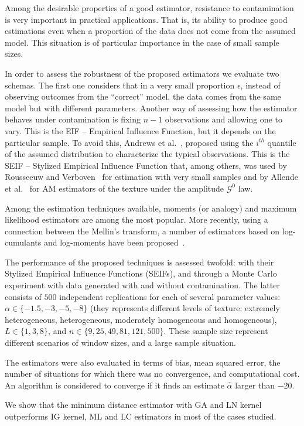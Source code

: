 \documentclass[a4paper]{article} %
\begin{document}
Among the desirable properties of a good estimator, resistance to contamination is very important in practical applications. 
That is, its ability to produce good estimations even when a proportion of the data does not come from the assumed model. 
This situation is of particular importance in the case of small sample sizes.

In order to assess the robustness of the proposed estimators we evaluate two schemas. 
The first one considers that in a very small proportion $\epsilon$, instead of observing outcomes from the ``correct'' model, the data comes from the same model but with different parameters.
Another way of assessing how the estimator behaves under contamination is fixing $n-1$ observations and allowing one to vary. 
This is the EIF -- Empirical Influence Function, but it depends on the particular sample.
To avoid this, Andrews et al.~\cite{Andrews1972}, proposed using the $i^{th}$ quantile of the assumed distribution to characterize the typical observations.
This is the SEIF -- Stylized Empirical Influence Function that, among others, was used by Rousseeuw and Verboven~\cite{RousseeuwCSDA} for estimation with very small samples and by Allende et al.~\cite{AllendeFreryetal:JSCS:05} for AM estimators of the texture under the amplitude $\mathcal G^0$ law.

Among the estimation techniques available, moments (or analogy) and maximum likelihood estimators are among the most popular.  
More recently, using a connection between the Mellin's transform, a number of estimators based on log-cumulants  and log-moments have been proposed~\cite{MellinAnalysisPolSAR,BujorTrouveValetNicolas2004,khan2014}.

The performance of the proposed techniques is assessed twofold: with their Stylized Empirical Influence Functions (SEIFs), and through a Monte Carlo experiment with data generated with and without contamination. 
The latter consists of $500$ independent replications for each of several parameter values: 
$\alpha\in\{-1.5, -3, -5, -8\}$ (they represents different levels of texture: extremely heterogeneous, heterogeneous, moderately homogeneous and homogeneous), 
$L\in\{1,3,8\}$, and 
$n\in\{9, 25,49, 81,121,500\}$. 
These sample size represent different scenarios of window sizes, and a large sample situation.

The estimators were also evaluated in terms of bias, mean squared error, the number of situations for which there was no convergence, and computational cost. 
An algorithm is considered to converge if it finds an estimate $\widehat{\alpha}$ larger than $-20$.

We show that the minimum distance estimator with GA and LN kernel outperforms IG kernel, ML and LC estimators in most of the cases studied.



\end{document}
